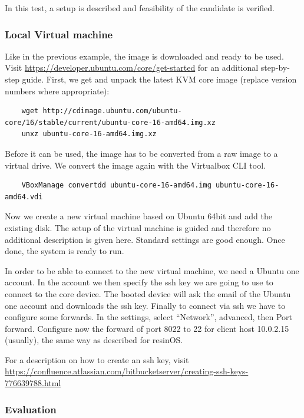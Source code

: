 \documentclass[]{scrartcl}
\begin{document}
In this test, a setup is described and feasibility of the candidate is verified.

\subsubsection{Local Virtual machine}

Like in the previous example, the image is downloaded and ready to be used. Visit \url{https://developer.ubuntu.com/core/get-started} for an additional step-by-step guide.
First, we get and unpack the latest KVM core image (replace version numbers where appropriate):

\begin{verbatim}
	wget http://cdimage.ubuntu.com/ubuntu-core/16/stable/current/ubuntu-core-16-amd64.img.xz
	unxz ubuntu-core-16-amd64.img.xz
\end{verbatim}

Before it can be used, the image has to be converted from a raw image to a virtual drive. We convert the image again with the Virtualbox CLI tool.

\begin{verbatim}
	VBoxManage convertdd ubuntu-core-16-amd64.img ubuntu-core-16-amd64.vdi
\end{verbatim}

Now we create a new virtual machine based on Ubuntu 64bit and add the existing disk. The setup of the virtual machine is guided and therefore no additional description is given here. Standard settings are good enough. Once done, the system is ready to run.

In order to be able to connect to the new virtual machine, we need a Ubuntu one account. In the account we then specify the ssh key we are going to use to connect to the core device. The booted device will ask the email of the Ubuntu one account and downloads the ssh key. Finally to connect via ssh we have to configure some forwards. In the settings, select ``Network'', advanced, then Port forward. Configure now the forward of port 8022 to 22 for client host 10.0.2.15 (usually), the same way as described for resinOS.

For a description on how to create an ssh key, visit \url{https://confluence.atlassian.com/bitbucketserver/creating-ssh-keys-776639788.html}


\subsubsection{Evaluation}
\end{document}
